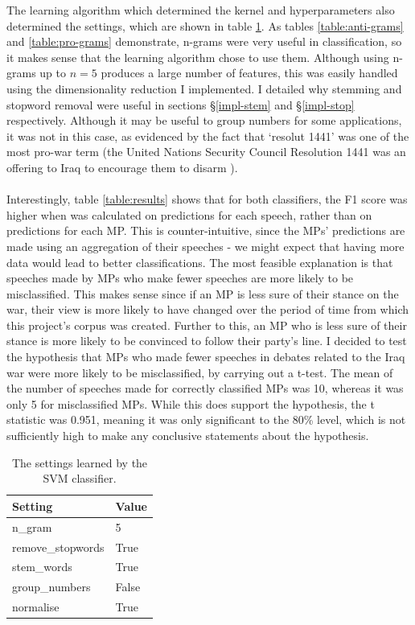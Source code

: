 \documentclass[12pt,a4paper,twoside,openright]{report}
\begin{document}
The learning algorithm which determined the kernel and hyperparameters also determined the settings, which are shown in table \ref{table:settings}. As tables \ref{table:anti-grams} and \ref{table:pro-grams} demonstrate, n-grams were very useful in classification, so it makes sense that the learning algorithm chose to use them. Although using n-grams up to $n = 5$ produces a large number of features, this was easily handled using the dimensionality reduction I implemented. I detailed why stemming and stopword removal were useful in sections \S\ref{impl-stem} and \S\ref{impl-stop} respectively. Although it may be useful to group numbers for some applications, it was not in this case, as evidenced by the fact that `resolut 1441' was one of the most pro-war term (the United Nations Security Council Resolution 1441 was an offering to Iraq to encourage them to disarm \cite{resolution}).
\\\\
Interestingly, table \ref{table:results} shows that for both classifiers, the F1 score was higher when was calculated on predictions for each speech, rather than on predictions for each MP. This is counter-intuitive, since the MPs' predictions are made using an aggregation of their speeches - we might expect that having more data would lead to better classifications. The most feasible explanation is that speeches made by MPs who make fewer speeches are more likely to be misclassified. This makes sense since if an MP is less sure of their stance on the war, their view is more likely to have changed over the period of time from which this project's corpus was created. Further to this, an MP who is less sure of their stance is more likely to be convinced to follow their party's line. I decided to test the hypothesis that MPs who made fewer speeches in debates related to the Iraq war were more likely to be misclassified, by carrying out a t-test. The mean of the number of speeches made for correctly classified MPs was 10, whereas it was only 5 for misclassified MPs. While this does support the hypothesis, the t statistic was 0.951, meaning it was only significant to the 80\% level, which is not sufficiently high to make any conclusive statements about the hypothesis.

\begin{table}[]
	\centering
	\begin{tabular}{ll}
		\hline
		\textbf{Setting}  & \textbf{Value} \\ \hline
		n\_gram           & 5              \\ 
		remove\_stopwords & True           \\
		stem\_words       & True           \\
		group\_numbers    & False          \\
		normalise         & True           \\
		\hline
	\end{tabular}
	\caption{The settings learned by the SVM classifier.}
	\label{table:settings}	
\end{table}
\end{document}
